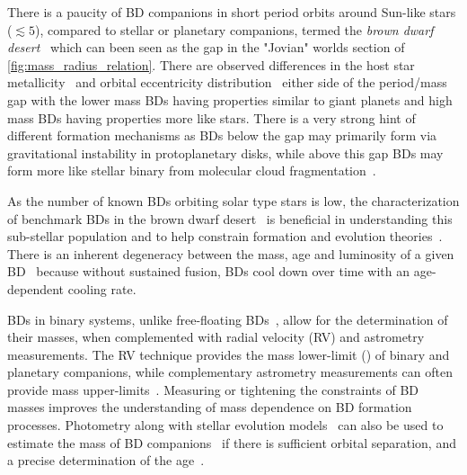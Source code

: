 There is a paucity of {BD} companions in short period orbits around Sun-like stars (\(\lesssim{}5 \)\AU{}), compared to stellar or planetary companions, termed the \emph{brown dwarf desert}~\citep{halbwachs_exploring_2000, zucker_analysis_2001, sahlmann_search_2011, ranc_moa2007blg197_2015} which can been seen as the gap in the "Jovian" worlds section of \cref{fig:mass_radius_relation}.
There are observed differences in the host star metallicity~\citep{maldonado_searching_2017, santos_observational_2017, schlaufman_evidence_2018} and orbital eccentricity distribution~\citep{ma_statistical_2014} either side of the period/mass gap with the lower mass BDs having properties similar to giant planets and high mass BDs having properties more like stars.
There is a very strong hint of different formation mechanisms as BDs below the gap may primarily form via gravitational instability in protoplanetary disks, while above this gap BDs may form more like stellar binary from molecular cloud fragmentation~\citep{ma_statistical_2014}.

As the number of known BDs orbiting solar type stars is low, the characterization of benchmark BDs in the brown dwarf desert~\citep[e.g.][]{crepp_trends_2016} is beneficial in understanding this sub-stellar population and to help constrain formation and evolution theories~\citep{whitworth_formation_2007}.
There is an inherent degeneracy between the mass, age and luminosity of a given BD~\citep{burrows_nongray_1997} because without sustained fusion, BDs cool down over time with an age-dependent cooling rate.

BDs in binary systems, unlike free-floating BDs~\citep[e.g][]{gagne_simp_2017}, allow for the determination of their masses, when complemented with radial velocity ({RV}) and astrometry measurements.
The {RV} technique provides the mass lower-limit (\Mtwosini{}) of binary and planetary companions, while complementary astrometry measurements can often provide mass upper-limits~\citep[e.g.][]{sahlmann_search_2011}.
Measuring or tightening the constraints of {BD} masses improves the understanding of mass dependence on {BD} formation processes.
Photometry along with stellar evolution models~\citep[e.g.][]{baraffe_evolutionary_2003,allard_btsettl_2013} can also be used to estimate the mass of {BD} companions~\citep[e.g.][]{moutou_eccentricity_2017} if there is sufficient orbital separation, and a precise determination of the age~\citep{soderblom_ages_2010}.


